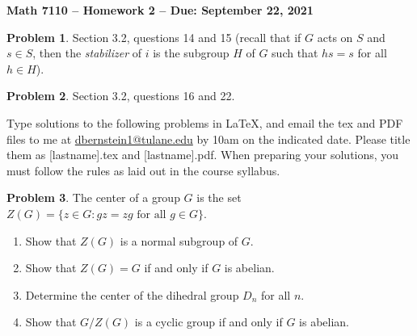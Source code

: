 \documentclass[letterpaper,11pt]{amsart}
\theoremstyle{plain}
\theoremstyle{definition}
\newtheorem{pr}{Problem}
\theoremstyle{remark}
\begin{document}
\Large

\begin{center}
{\bf Math 7110 -- Homework  2 --  Due:  September 22, 2021}
\end{center}

\normalsize



\medskip


\begin{pr}
    Section 3.2, questions 14 and 15 (recall that if $G$ acts on $S$ and $s \in S$, then the \emph{stabilizer} of $i$ is the subgroup $H$ of $G$ such that $hs = s$ for all $h \in H$).
\end{pr}

\begin{pr}
    Section 3.2, questions 16 and 22.
\end{pr}

\bigskip

Type solutions to the following problems in \LaTeX, and email the tex and PDF files to me at \url{dbernstein1@tulane.edu} by 10am on the indicated date.
Please title them as [lastname].tex and [lastname].pdf.
When preparing your solutions, you must follow the rules as laid out in the course syllabus.

\vspace{.5cm}


\begin{pr}
The center of a group $G$ is the set $Z(G) = \{ z \in G : gz = zg \mbox{ for all } g \in G\}$.
\begin{enumerate}
\item  Show that $Z(G)$ is a normal subgroup of $G$.
\item  Show that $Z(G) = G$ if and only if $G$ is abelian.
\item  Determine the center of the dihedral group $D_n$ for all $n$.
\item  Show that $G/Z(G)$ is a cyclic group if and only if $G$ is abelian.
\end{enumerate}
\end{pr}
\end{document}
